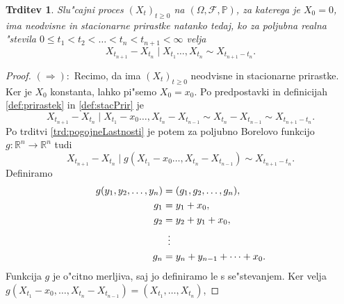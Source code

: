 \documentclass[12pt, a4paper, reqno]{amsart}
\theoremstyle{definition}
\theoremstyle{plain}
\newtheorem{trditev}[definicija]{Trditev}
\newcommand{\R}{\mathbb{R}}
\newcommand{\F}{\mathcal{F}}
\newcommand{\1}{\mathds{1}}
\newcommand*{\refPriloga}[1]{%
  \begingroup
    \hypersetup{
      linkcolor=red,
      linkbordercolor=red,
    }%
    \ref{#1}%
  \endgroup
}
\begin{document}
        \pagebreak
        \begin{trditev}
            Slu"cajni proces $(X_t)_{t\geq0}$ na $(\Omega, \F, \mathbb{P})$, za katerega je $X_0 = 0$, ima
            neodvisne in stacionarne prirastke natanko tedaj, ko za poljubna realna "stevila
            $0\leq t_1 < t_2 < \ldots < t_n < t_{n+1} < \infty$ velja 
            \begin{equation}
                X_{t_{n+1}} - X_{t_n}\mid X_{t_1} \dots, X_{t_n} \sim X_{t_{n+1} - t_n}.
                \label{eq:neodvisnostStacionarnostPrirastov}
            \end{equation}
            \label{trd:neodvisnostStacionarnostPrirastov}
        \end{trditev}

        \begin{proof}
            $(\Rightarrow):$ Recimo, da ima $(X_t)_{t\geq0}$ neodvisne in stacionarne prirastke. Ker je 
            $X_0$ konstanta, lahko pi"semo $X_0 = x_0$. Po predpostavki in definicijah \refPriloga{def:prirastek} in 
            \refPriloga{def:stacPrir} je 
            \begin{equation*}
                X_{t_{n+1}} - X_{t_n}\mid X_{t_1} - x_0 \dots, X_{t_n} - X_{t_{n-1}}\sim X_{t_n} - X_{t_{n-1}} \sim X_{t_{n+1} - t_n}.
            \end{equation*}
            Po trditvi \refPriloga{trd:pogojneLastnosti} je potem za poljubno Borelovo funkcijo $g:\R^{n}\to \R^{n}$
            tudi 
            \begin{equation*}
                X_{t_{n+1}} - X_{t_n}\mid g(X_{t_1} - x_0 \dots, X_{t_n} - X_{t_{n-1}}) \sim X_{t_{n+1} - t_n}.
            \end{equation*}
            Definiramo 
            \begin{align*}
                g(y_1, y_2, \dots, y_n) &= (g_1, g_2, \dots, g_n),\\
                                    g_1 &= y_1 + x_0, \\
                                    g_2 &= y_2 + y_1 + x_0, \\
                                    &\mathrel{\makebox[\widthof{=}]{\vdots}} \\
                                    g_n &= y_n + y_{n-1} + \cdots + x_0.
            \end{align*}
            Funkcija $g$ je o"citno merljiva, saj jo definiramo le s se"stevanjem. Ker velja
            $g(X_{t_1} - x_0, \dots, X_{t_n} - X_{t_{n-1}}) = (X_{t_1}, \dots, X_{t_n})$, 

\end{proof}
\end{document}
